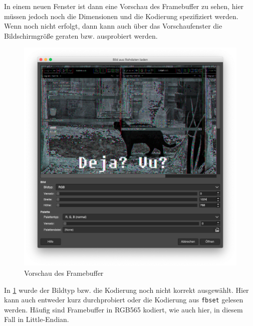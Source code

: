 In einem neuen Fenster ist dann eine Vorschau des Framebuffer zu sehen, hier müssen jedoch noch die Dimensionen und die Kodierung spezifiziert werden.
Wenn noch nicht erfolgt, dann kann auch über das Vorschaufenster die Bildschirmgröße geraten bzw. ausprobiert werden.

\begin{figure}[!ht]
\centering
\includegraphics[width=\textwidth]{img/video_gimp_load.png}
\caption{Vorschau des Framebuffer}
\label{fig:video_gimp_load}
\end{figure}

In \cref{fig:video_gimp_load} wurde der Bildtyp bzw. die Kodierung noch nicht korrekt ausgewählt.
Hier kann auch entweder kurz durchprobiert oder die Kodierung aus \texttt{fbset} gelesen werden.
Häufig sind Framebuffer in RGB565 kodiert, wie auch hier, in diesem Fall in Little-Endian.

